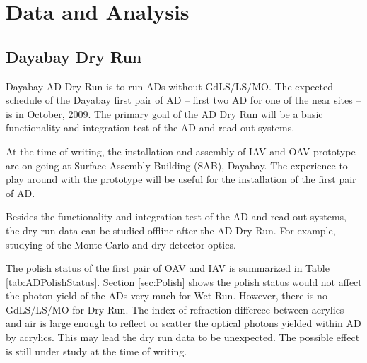 \chapter {Data and Analysis}
\section {Dayabay Dry Run}

Dayabay AD Dry Run is to run ADs without GdLS/LS/MO.
The expected schedule of the Dayabay first pair of AD -- first two AD for one of the near sites --
is in October, 2009. The primary goal of the AD Dry Run will be a basic functionality and integration test of the AD and read out systems.

At the time of writing, the installation and assembly of IAV and OAV prototype are on going at Surface Assembly Building (SAB), Dayabay.
The experience to play around with the prototype will be useful for the installation of the first pair of AD.

Besides the functionality and integration test of the AD and read out systems, the dry run data can be studied offline
after the AD Dry Run. For example, studying of the Monte Carlo and dry detector optics.

The polish status of the first pair of OAV and IAV is summarized in Table \ref{tab:ADPolishStatus}.
Section \ref{sec:Polish} shows the polish status would not affect the photon yield of the ADs
very much for Wet Run. However, there is no GdLS/LS/MO for Dry Run. The index of refraction
differece between acrylics and air is large enough to reflect or scatter the optical photons
yielded within AD by acrylics. This may lead the dry run data to be unexpected.
The possible effect is still under study at the time of writing.







